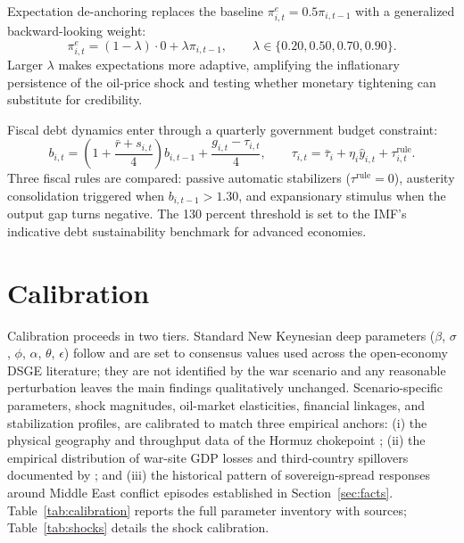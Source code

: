 \documentclass[12pt]{article}
\begin{document}
Expectation de-anchoring replaces the baseline $\pi^e_{i,t} = 0.5\pi_{i,t-1}$ with a generalized backward-looking weight:
\begin{equation}
\pi^e_{i,t}=(1-\lambda)\cdot 0+\lambda\pi_{i,t-1},\qquad
\lambda\in\{0.20,0.50,0.70,0.90\}.
\label{eq:deanchoring}
\end{equation}
Larger $\lambda$ makes expectations more adaptive, amplifying the inflationary persistence of the oil-price shock and testing whether monetary tightening can substitute for credibility.

Fiscal debt dynamics enter through a quarterly government budget constraint:
\begin{equation}
b_{i,t}=\left(1+\frac{\bar r+s_{i,t}}{4}\right)b_{i,t-1}
       +\frac{g_{i,t}-\tau_{i,t}}{4},\qquad
\tau_{i,t}=\bar{\tau}_i+\eta_i\hat{y}_{i,t}+\tau^{\text{rule}}_{i,t}.
\label{eq:debt}
\end{equation}
Three fiscal rules are compared: passive automatic stabilizers ($\tau^{\text{rule}}=0$), austerity consolidation triggered when $b_{i,t-1}>1.30$, and expansionary stimulus when the output gap turns negative. The 130 percent threshold is set to the IMF's indicative debt sustainability benchmark for advanced economies.


\section{Calibration}
\label{sec:calibration}

Calibration proceeds in two tiers. Standard New Keynesian deep parameters ($\beta$, $\sigma$, $\phi$, $\alpha$, $\theta$, $\epsilon$) follow \citet{gali2015monetary} and are set to consensus values used across the open-economy DSGE literature; they are not identified by the war scenario and any reasonable perturbation leaves the main findings qualitatively unchanged. Scenario-specific parameters, shock magnitudes, oil-market elasticities, financial linkages, and stabilization profiles, are calibrated to match three empirical anchors: (i) the physical geography and throughput data of the Hormuz chokepoint \citep{eia2023hormuz}; (ii) the empirical distribution of war-site GDP losses and third-country spillovers documented by \citet{federle2026price}; and (iii) the historical pattern of sovereign-spread responses around Middle East conflict episodes established in Section~\ref{sec:facts}. Table~\ref{tab:calibration} reports the full parameter inventory with sources; Table~\ref{tab:shocks} details the shock calibration.
\end{document}
